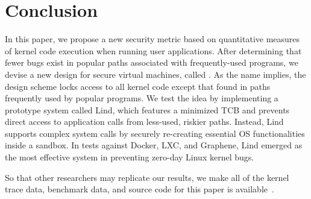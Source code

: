 \section{Conclusion}
\label{sec.conclusion}

In this paper, we propose a new security metric based on quantitative measures of kernel code execution when running user applications.
After determining that fewer bugs exist in popular paths associated with frequently-used
programs, we devise a new design for secure virtual machines, called \lip.
As the name implies, the design scheme locks access to all
kernel code except that found in paths frequently used by
popular programs. We test the \lip idea by implementing a prototype system
called Lind, which features a minimized TCB and prevents direct access to application
calls from less-used, riskier paths.
Instead, Lind supports complex system calls by securely re-creating
essential OS functionalities inside a sandbox.
In tests against Docker, LXC, and Graphene, Lind emerged as the most effective system in preventing
zero-day Linux kernel bugs.

So that other researchers may replicate our results, we make all of the kernel
trace data, benchmark data, and source code for this paper is
available~\cite{Lind}. 
